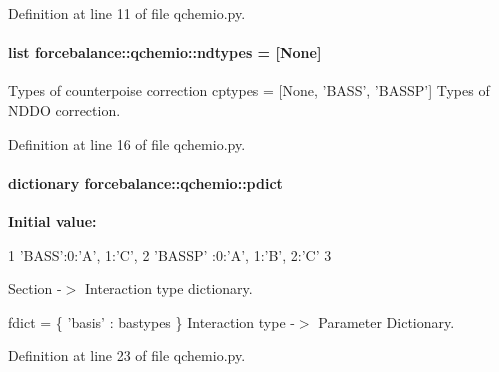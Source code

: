 \-Definition at line 11 of file qchemio.\-py.

\hypertarget{namespaceforcebalance_1_1qchemio_a18a590388e19839ca2e5c1e14d6062ba}{
\paragraph[{ndtypes}]{\setlength{\rightskip}{0pt plus 5cm}list {\bf forcebalance\-::qchemio\-::ndtypes} = \mbox{[}\-None\mbox{]}}}\label{namespaceforcebalance_1_1qchemio_a18a590388e19839ca2e5c1e14d6062ba}


\-Types of counterpoise correction cptypes = \mbox{[}\-None, '\-B\-A\-S\-S', '\-B\-A\-S\-S\-P'\mbox{]} \-Types of \-N\-D\-D\-O correction. 



\-Definition at line 16 of file qchemio.\-py.

\hypertarget{namespaceforcebalance_1_1qchemio_aa37b6283447914c5c75e76c8475e201e}{
\paragraph[{pdict}]{\setlength{\rightskip}{0pt plus 5cm}dictionary {\bf forcebalance\-::qchemio\-::pdict}}}\label{namespaceforcebalance_1_1qchemio_aa37b6283447914c5c75e76c8475e201e}
{\bfseries \-Initial value\-:}
\begin{DoxyCode}
1 {'BASS':{0:'A', 1:'C'},
2          'BASSP' :{0:'A', 1:'B', 2:'C'}
3          }
\end{DoxyCode}


\-Section -\/$>$ \-Interaction type dictionary. 

fdict = \{ 'basis' \-: bastypes \} \-Interaction type -\/$>$ \-Parameter \-Dictionary. 

\-Definition at line 23 of file qchemio.\-py.


